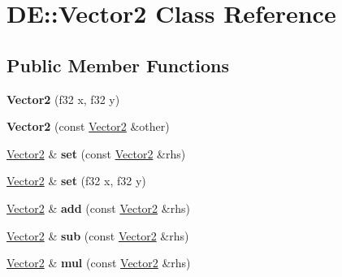 \hypertarget{classDE_1_1Vector2}{}\section{DE\+:\+:Vector2 Class Reference}
\label{classDE_1_1Vector2}
\subsection*{Public Member Functions}
\begin{DoxyCompactItemize}
\item 
{\bfseries Vector2} (f32 x, f32 y)\hypertarget{classDE_1_1Vector2_a6b9dc2a7e1cd5554a4d8d3bba4eab103}{}\label{classDE_1_1Vector2_a6b9dc2a7e1cd5554a4d8d3bba4eab103}

\item 
{\bfseries Vector2} (const \hyperlink{classDE_1_1Vector2}{Vector2} \&other)\hypertarget{classDE_1_1Vector2_ab6bf7d974ae767177f2ed39b31842b8e}{}\label{classDE_1_1Vector2_ab6bf7d974ae767177f2ed39b31842b8e}

\item 
\hyperlink{classDE_1_1Vector2}{Vector2} \& {\bfseries set} (const \hyperlink{classDE_1_1Vector2}{Vector2} \&rhs)\hypertarget{classDE_1_1Vector2_a591eb991f8782ab2a74adf77722d5966}{}\label{classDE_1_1Vector2_a591eb991f8782ab2a74adf77722d5966}

\item 
\hyperlink{classDE_1_1Vector2}{Vector2} \& {\bfseries set} (f32 x, f32 y)\hypertarget{classDE_1_1Vector2_a74e9102e534f9c75f52ed280d2958b1d}{}\label{classDE_1_1Vector2_a74e9102e534f9c75f52ed280d2958b1d}

\item 
\hyperlink{classDE_1_1Vector2}{Vector2} \& {\bfseries add} (const \hyperlink{classDE_1_1Vector2}{Vector2} \&rhs)\hypertarget{classDE_1_1Vector2_a41942dbaa5c06206949eac3c1ec3a154}{}\label{classDE_1_1Vector2_a41942dbaa5c06206949eac3c1ec3a154}

\item 
\hyperlink{classDE_1_1Vector2}{Vector2} \& {\bfseries sub} (const \hyperlink{classDE_1_1Vector2}{Vector2} \&rhs)\hypertarget{classDE_1_1Vector2_a9f38511737694114c76d2e49dca9534e}{}\label{classDE_1_1Vector2_a9f38511737694114c76d2e49dca9534e}

\item 
\hyperlink{classDE_1_1Vector2}{Vector2} \& {\bfseries mul} (const \hyperlink{classDE_1_1Vector2}{Vector2} \&rhs)\hypertarget{classDE_1_1Vector2_a133057a82ffa02694b320338f67e0c70}{}\label{classDE_1_1Vector2_a133057a82ffa02694b320338f67e0c70}


\end{DoxyCompactItemize}
